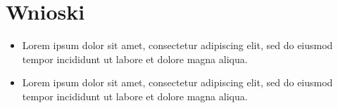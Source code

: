 \documentclass[12pt]{article}
\begin{document}
\pagebreak %
\quad


\section{Wnioski}

\begin{itemize}

\item Lorem ipsum dolor sit amet, consectetur adipiscing elit, sed do eiusmod tempor incididunt ut labore et dolore magna aliqua.

\item Lorem ipsum dolor sit amet, consectetur adipiscing elit, sed do eiusmod tempor incididunt ut labore et dolore magna aliqua.

\end{itemize}
\end{document}
